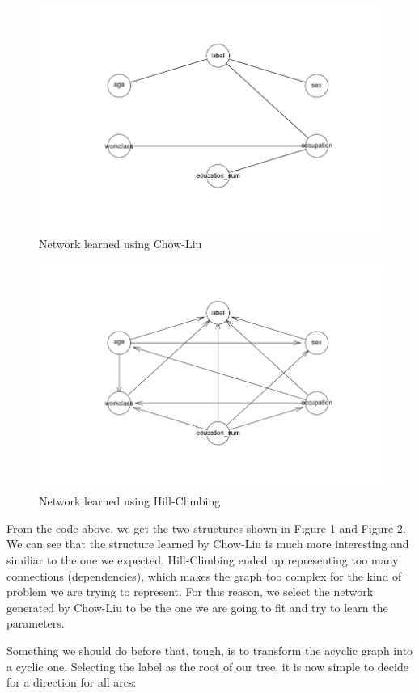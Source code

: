 \documentclass{article}
\begin{document}
\begin{figure}[htb]
\centering
\includegraphics[width=.9\linewidth]{./img/net_cl.png}
\caption{Network learned using Chow-Liu}
\end{figure}

\begin{figure}[htb]
\centering
\includegraphics[width=.9\linewidth]{./img/net_hc.png}
\caption{Network learned using Hill-Climbing}
\end{figure}

From the code above, we get the two structures shown in Figure 1 and Figure 2. We can see that
the structure learned by Chow-Liu is much more interesting and similiar to the one we expected.
Hill-Climbing ended up representing too many connections (dependencies), which makes the graph
too complex for the kind of problem we are trying to represent. For this reason, we select the
network generated by Chow-Liu to be the one we are going to fit and try to learn the parameters.

Something we should do before that, tough, is to transform the acyclic graph into a cyclic
one. Selecting the label as the root of our tree, it is now simple to decide for a direction for
all arcs:
\end{document}
